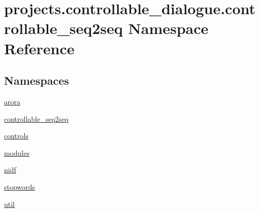 \hypertarget{namespaceprojects_1_1controllable__dialogue_1_1controllable__seq2seq}{}\section{projects.\+controllable\+\_\+dialogue.\+controllable\+\_\+seq2seq Namespace Reference}
\label{namespaceprojects_1_1controllable__dialogue_1_1controllable__seq2seq}
\subsection*{Namespaces}
\begin{DoxyCompactItemize}
\item 
 \hyperlink{namespaceprojects_1_1controllable__dialogue_1_1controllable__seq2seq_1_1arora}{arora}
\item 
 \hyperlink{namespaceprojects_1_1controllable__dialogue_1_1controllable__seq2seq_1_1controllable__seq2seq}{controllable\+\_\+seq2seq}
\item 
 \hyperlink{namespaceprojects_1_1controllable__dialogue_1_1controllable__seq2seq_1_1controls}{controls}
\item 
 \hyperlink{namespaceprojects_1_1controllable__dialogue_1_1controllable__seq2seq_1_1modules}{modules}
\item 
 \hyperlink{namespaceprojects_1_1controllable__dialogue_1_1controllable__seq2seq_1_1nidf}{nidf}
\item 
 \hyperlink{namespaceprojects_1_1controllable__dialogue_1_1controllable__seq2seq_1_1stopwords}{stopwords}
\item 
 \hyperlink{namespaceprojects_1_1controllable__dialogue_1_1controllable__seq2seq_1_1util}{util}
\end{DoxyCompactItemize}
